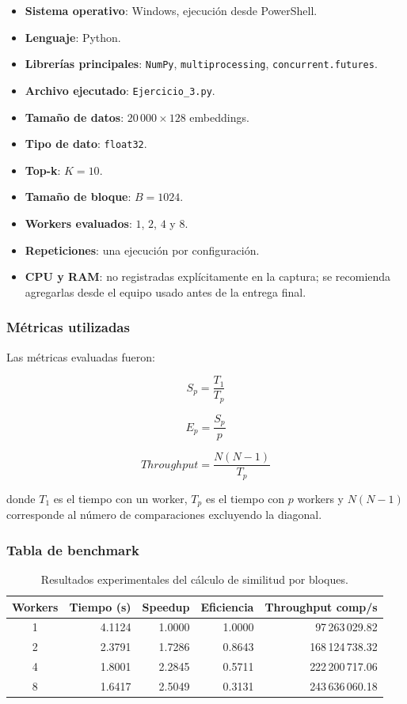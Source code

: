 \documentclass[10pt,a4paper]{article}
\begin{document}
\begin{itemize}
    \item \textbf{Sistema operativo}: Windows, ejecuci\'on desde PowerShell.
    \item \textbf{Lenguaje}: Python.
    \item \textbf{Librer\'ias principales}: \texttt{NumPy},
        \texttt{multiprocessing}, \texttt{concurrent.futures}.
    \item \textbf{Archivo ejecutado}: \texttt{Ejercicio\_3.py}.
    \item \textbf{Tama\~no de datos}: $20\,000 \times 128$ embeddings.
    \item \textbf{Tipo de dato}: \texttt{float32}.
    \item \textbf{Top-k}: $K=10$.
    \item \textbf{Tama\~no de bloque}: $B=1024$.
    \item \textbf{Workers evaluados}: $1$, $2$, $4$ y $8$.
    \item \textbf{Repeticiones}: una ejecuci\'on por configuraci\'on.
    \item \textbf{CPU y RAM}: no registradas expl\'icitamente en la captura;
        se recomienda agregarlas desde el equipo usado antes de la entrega
        final.
\end{itemize}

\subsubsection{M\'etricas utilizadas}

Las m\'etricas evaluadas fueron:

\[
S_p = \frac{T_1}{T_p}
\]

\[
E_p = \frac{S_p}{p}
\]

\[
Throughput = \frac{N(N-1)}{T_p}
\]

donde $T_1$ es el tiempo con un worker, $T_p$ es el tiempo con $p$ workers y
$N(N-1)$ corresponde al n\'umero de comparaciones excluyendo la diagonal.

\subsubsection{Tabla de benchmark}

\begin{table}[H]
\centering
\begin{tabular}{crrrr}
\toprule
\textbf{Workers} & \textbf{Tiempo (s)} & \textbf{Speedup} & \textbf{Eficiencia} & \textbf{Throughput comp/s} \\
\midrule
1 & 4.1124 & 1.0000 & 1.0000 & 97\,263\,029.82 \\
2 & 2.3791 & 1.7286 & 0.8643 & 168\,124\,738.32 \\
4 & 1.8001 & 2.2845 & 0.5711 & 222\,200\,717.06 \\
8 & 1.6417 & 2.5049 & 0.3131 & 243\,636\,060.18 \\
\bottomrule
\end{tabular}
\caption{Resultados experimentales del c\'alculo de similitud por bloques.}
\end{table}
\end{document}
